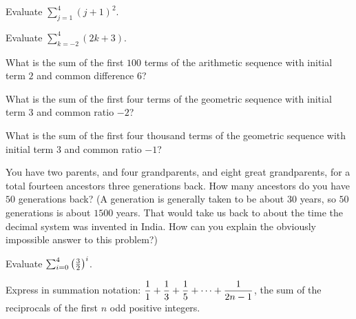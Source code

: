 \begin{prob} 
 Evaluate $\sum_{j=1}^{4} (j+1)^{2}$.
\end{prob}

\begin{prob}
 Evaluate $\sum_{k=-2}^{4} (2k+3)$.
\end{prob}

\begin{prob}
 What is the sum of the first $100$ terms  of the arithmetic sequence with initial
term $2$ and common difference $6$?
\end{prob}

\begin{prob} 
 What is the sum of the first four terms of the geometric sequence with initial
term $3$ and common ratio $-2$?
\end{prob}

\begin{prob}
What is the sum of the first four thousand terms of the geometric sequence with initial
term $3$ and common ratio $-1$?
\end{prob}

\begin{prob}
You have two parents, and four grandparents, and eight great grandparents, for a total fourteen 
ancestors three generations back. How many ancestors do you have $50$ generations back?
(A generation is generally taken to be about $30$ years, so $50$ generations is about $1500$
years. That would take us back to about the time the decimal system was invented in India. 
How can you explain the obviously impossible answer to this problem?)
\end{prob}

\begin{prob} 
 Evaluate $\sum_{i=0}^{4} \left({3\over2}\right)^i$.
 \end{prob}

\begin{prob}
 Express in summation notation: $\displaystyle {1\over1}+{1\over3}+{1\over5}+
\cdots+{1\over{2n-1}}$, the sum of the reciprocals of the first $n$ odd
positive integers.
 \end{prob}
 


